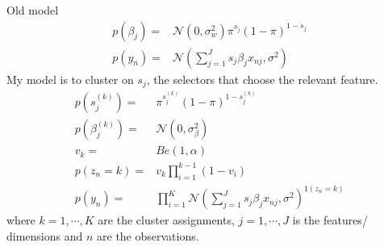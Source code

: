 \documentclass{article}
\begin{document}
Old model
\begin{align}
\nonumber p(\beta_j)=&\mathcal{N}(0,\sigma_{w}^2)\pi^{s_j}(1-\pi)^{1-s_j}\\
\nonumber p(y_n)=&\mathcal{N}\left(\sum_{j=1}^{J}s_j\beta_jx_{nj},\sigma^2\right)
\end{align}
My model is to cluster on $s_j$, the selectors that choose the relevant feature.
\begin{align}
p(s_j^{(k)})=&\pi^{s_j^{(k)}}(1-\pi)^{1-s_j^{(k)}}\\
p(\beta_j^{(k)})=&\mathcal{N}(0,\sigma_{\beta}^2)\\
v_k=& Be(1,\alpha)\\
p(z_n=k)=& v_k\prod_{i=1}^{k-1}(1-v_i)\\
p(y_n)=&\prod_{i=1}^{K}\mathcal{N}(\sum_{j=1}^{J}s_j\beta_jx_{nj},\sigma^2)^{1(z_n=k)}
\end{align}
where $k=1,\cdots,K$ are the cluster assignments, $j=1,\cdots,J$ is the features/ dimensions and $n$ are the observations.
\end{document}
